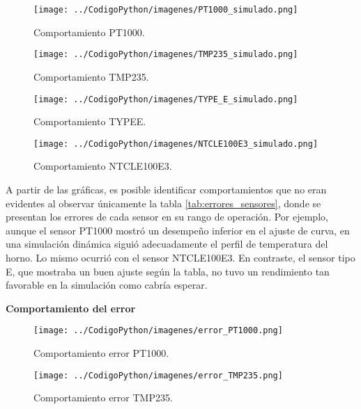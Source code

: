 \documentclass[conference]{IEEEtran}
\begin{document}
\begin{figure}[h!]
	\centering
	\texttt{[image: ../CodigoPython/imagenes/PT1000\_simulado.png]}
	\caption{Comportamiento PT1000.}
	\label{fig:PT1000_simulado}
\end{figure}

\begin{figure}[h!]
	\centering
	\texttt{[image: ../CodigoPython/imagenes/TMP235\_simulado.png]}
	\caption{Comportamiento TMP235.}
	\label{fig:TMP235_simulado}
\end{figure}

\begin{figure}[h!]
	\centering
	\texttt{[image: ../CodigoPython/imagenes/TYPE\_E\_simulado.png]}
	\caption{Comportamiento TYPEE.}
	\label{fig:TYPE_E_simulado}
\end{figure}

\begin{figure}[h!]
	\centering
	\texttt{[image: ../CodigoPython/imagenes/NTCLE100E3\_simulado.png]}
	\caption{Comportamiento NTCLE100E3.}
	\label{fig:NTCLE100E3_simulado}
\end{figure}

A partir de las gráficas, es posible identificar comportamientos que no eran evidentes al observar únicamente la tabla \ref{tab:errores_sensores}, donde se presentan los errores de cada sensor en su rango de operación. Por ejemplo, aunque el sensor PT1000 mostró un desempeño inferior en el ajuste de curva, en una simulación dinámica siguió adecuadamente el perfil de temperatura del horno. Lo mismo ocurrió con el sensor NTCLE100E3. En contraste, el sensor tipo E, que mostraba un buen ajuste según la tabla, no tuvo un rendimiento tan favorable en la simulación como cabría esperar.



\textbf{Comportamiento del error}


\begin{figure}[h!]
	\centering
	\texttt{[image: ../CodigoPython/imagenes/error\_PT1000.png]}
	\caption{Comportamiento error PT1000.}
	\label{fig:error_PT1000}
\end{figure}

\begin{figure}[h!]
	\centering
	\texttt{[image: ../CodigoPython/imagenes/error\_TMP235.png]}
	\caption{Comportamiento error TMP235.}
	\label{fig:error_TMP235}
\end{figure}
\end{document}
